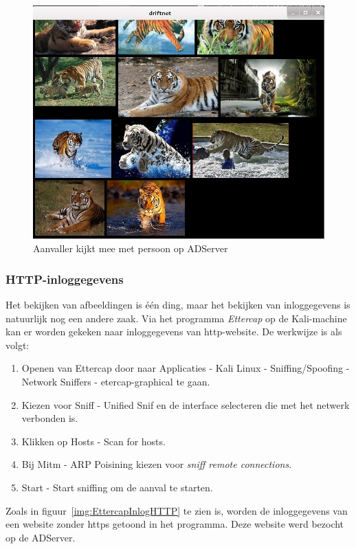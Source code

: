 \documentclass[pdftex,a4paper,12pt]{report}
\begin{document}
\begin{figure}[H]
\begin{center}
\includegraphics[scale=0.60]{img/Driftnet}
\end{center}
\caption{Aanvaller kijkt mee met persoon op ADServer}
\label{img:Driftnet}
\end{figure}

\subsubsection{HTTP-inloggegevens}
Het bekijken van afbeeldingen is één ding, maar het bekijken van inloggegevens is natuurlijk nog een andere zaak. Via het programma \textit{Ettercap} op de Kali-machine kan er worden gekeken naar inloggegevens van http-website. De werkwijze is als volgt:
\begin{enumerate}
	\item Openen van Ettercap door naar Applicaties - Kali Linux - Sniffing/Spoofing - Network Sniffers - etercap-graphical te gaan.
	\item Kiezen voor Sniff - Unified Snif en de interface selecteren die met het netwerk verbonden is.
	\item Klikken op Hosts - Scan for hosts.
	\item Bij Mitm - ARP Poisining kiezen voor \textit{sniff remote connections}.
	\item Start - Start sniffing om de aanval te starten.
\end{enumerate}
Zoals in figuur~\ref{img:EttercapInlogHTTP} te zien is, worden de inloggegevens van een website zonder https getoond in het programma. Deze website werd bezocht op de ADServer. \citep{DemmSec2013} 
\end{document}

